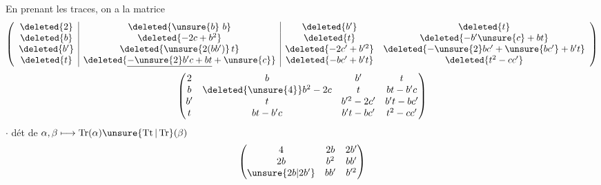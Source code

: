 
En prenant les traces, on a la matrice
\[
\left(\begin{array}{c|c|cc}
\deleted{2}&\deleted{\unsure{b}\ b}&\deleted{b'}&\deleted{t}\\
\deleted{b}&\deleted{-2c+b^2}&\deleted{t}&\deleted{-b'\unsure{c}+bt}\\
\deleted{b'}&\deleted{\unsure{2(bb')}\,t}&\deleted{-2c'+b'^2}&\deleted{-\unsure{2}bc'+\unsure{bc'}+b't}\\
\deleted{t}&\deleted{\underline{-\unsure{2}b'c+bt}+\unsure{c}}&\deleted{-bc'+b't}&\deleted{t^2-cc'}
\end{array}\right)
\]
\[
\begin{pmatrix}
2&b&b'&t\\
b&\deleted{\unsure{4}}b^2-2c&t&bt-b'c\\
b'&t&b'^2-2c'&b't-bc'\\
t&bt-b'c&b't-bc'&t^2-cc'
\end{pmatrix}
\]
$\cdot$ dét de $\alpha,\beta\longmapsto\operatorname{Tr}(\alpha)\unsure{\operatorname{Tt}|\operatorname{Tr}}(\beta)$
\[
\begin{pmatrix}
4&2b&2b'\\2b&b^2&bb'\\\unsure{2b|2b'}&bb'&b'^2
\end{pmatrix}
\]
